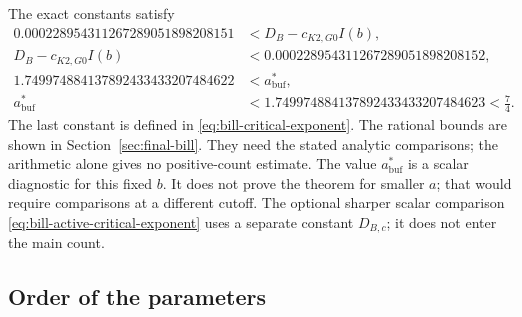The exact constants satisfy
\begin{equation}\label{eq:intro-price}
\begin{aligned}
 0.000228954311267289051898208151
   &<D_B-c_{K2,G0}I(b),\\
 D_B-c_{K2,G0}I(b)
   &<0.000228954311267289051898208152,\\
 1.749974884137892433433207484622
   &<a_{\mathrm{buf}}^*,\\
 a_{\mathrm{buf}}^*
   &<1.749974884137892433433207484623<\frac74.
\end{aligned}
\end{equation}
The last constant is defined in \eqref{eq:bill-critical-exponent}.
The rational bounds are shown in Section~\ref{sec:final-bill}.
They need the stated analytic comparisons;
the arithmetic alone gives no positive-count estimate.
The value $a^*_{\mathrm{buf}}$ is a scalar diagnostic for this fixed $b$.
It does not prove the theorem for smaller $a$; that would require
comparisons at a different cutoff. The optional sharper scalar comparison
\eqref{eq:bill-active-critical-exponent} uses a separate constant
$D_{B,c}$; it does not enter the main count.

\subsection{Order of the parameters}

